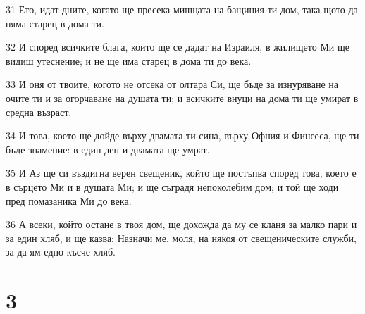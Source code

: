 \par 31 Ето, идат дните, когато ще пресека мишцата на бащиния ти дом, така щото да няма старец в дома ти.
\par 32 И според всичките блага, които ще се дадат на Израиля, в жилището Ми ще видиш утеснение; и не ще има старец в дома ти до века.
\par 33 И оня от твоите, когото не отсека от олтара Си, ще бъде за изнуряване на очите ти и за огорчаване на душата ти; и всичките внуци на дома ти ще умират в средна възраст.
\par 34 И това, което ще дойде върху двамата ти сина, върху Офния и Финееса, ще ти бъде знамение: в един ден и двамата ще умрат.
\par 35 И Аз ще си въздигна верен свещеник, който ще постъпва според това, което е в сърцето Ми и в душата Ми; и ще съградя непоколебим дом; и той ще ходи пред помазаника Ми до века.
\par 36 А всеки, който остане в твоя дом, ще дохожда да му се кланя за малко пари и за един хляб, и ще казва: Назначи ме, моля, на някоя от свещеническите служби, за да ям едно късче хляб.

\chapter{3}

